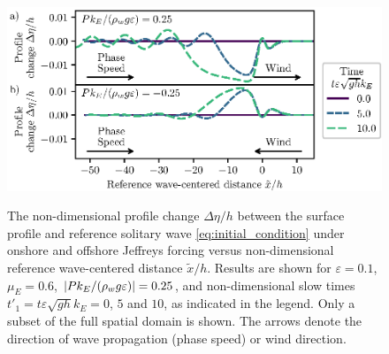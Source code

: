 \documentclass{jfm}
\renewcommand*{\epsilon}{\varepsilon}
\begin{document}
\begin{figure}
  \centering
  { %
    \label{fig:snapshots_solitary_tail:a}
    \label{fig:snapshots_solitary_tail:b}
  }
  \includegraphics{Snapshots-Positive-Negative-Tail.eps}
  \caption{
    The non-dimensional profile change $\Delta \eta/h$ between the
    surface profile and reference solitary wave
    \cref{eq:initial_condition} under
     onshore and
     offshore Jeffreys forcing
    versus non-dimensional reference wave-centered distance
    $\tilde{x}/h$.
    Results are shown for $\epsilon=0.1$, $\mu_E = 0.6$, $\abs{P
    k_E/(\rho_w g \epsilon)} = 0.25$, and non-dimensional slow times
    $t'_1 = t \epsilon \sqrt{gh} k_E = 0$, $5$ and $10$, as indicated
    in the legend.
    Only a subset of the full spatial domain is shown.
    The arrows denote the direction of wave propagation (phase speed) or
    wind direction.
  }\label{fig:snapshots_solitary_tail}
\end{figure}
\end{document}
